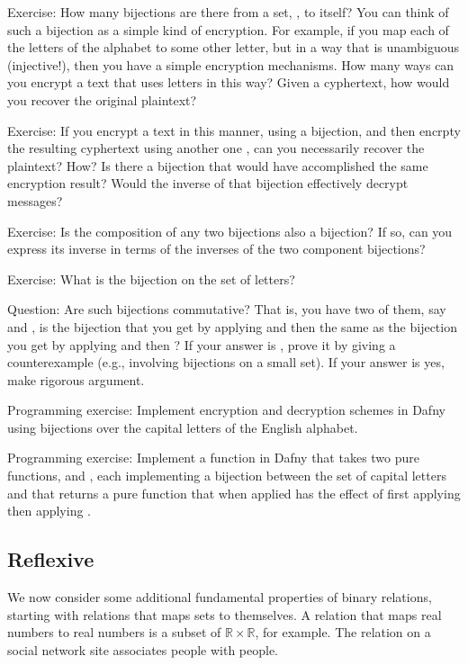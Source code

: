 \documentclass[letterpaper,10pt,english]{sphinxmanual}
\begin{document}
Exercise: How many bijections are there from a set, , to itself?
You can think of such a bijection as a simple kind of encryption. For
example, if you map each of the  letters of the alphabet to some
other letter, but in a way that is unambiguous (injective!), then you
have a simple encryption mechanisms. How many ways can you encrypt a
text that uses  letters in this way? Given a cyphertext, how would
you recover the original plaintext?

Exercise: If you encrypt a text in this manner, using a bijection,
 and then encrpty the resulting cyphertext using another one ,
can you necessarily recover the plaintext? How? Is there a 
bijection that would have accomplished the same encryption result?
Would the inverse of that bijection effectively decrypt messages?

Exercise: Is the composition of any two bijections also a bijection?
If so, can you express its inverse in terms of the inverses of the two
component bijections?

Exercise: What is the  bijection on the set of  letters?

Question: Are such bijections commutative? That is, you have two of
them, say  and , is the bijection that you get by applying 
and then  the same as the bijection you get by applying  and
then ? If your answer is , prove it by giving a counterexample
(e.g., involving bijections on a small set). If your answer is yes,
make rigorous argument.

Programming exercise: Implement encryption and decryption schemes in
Dafny using bijections over the  capital letters of the English
alphabet.

Programming exercise: Implement a  function in Dafny that
takes two pure functions,  and , each implementing a bijection
between the set of capital letters and that returns a pure function
that when applied has the effect of first applying  then applying
.


\subsection{Reflexive}
\label{\detokenize{07-set-theory:reflexive}}
We now consider some additional fundamental properties of binary
relations, starting with relations that maps sets to themselves.  A
relation that maps real numbers to real numbers is a subset of
\({\mathbb R} \times {\mathbb R}\), for example. The 
relation on a social network site associates people with people.
\end{document}
